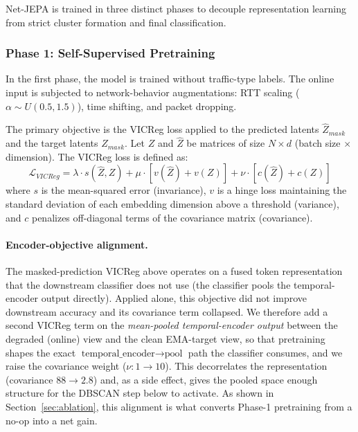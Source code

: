 \documentclass{article}
\begin{document}
Net-JEPA is trained in three distinct phases to decouple representation learning from strict cluster formation and final classification.

\subsubsection{Phase 1: Self-Supervised Pretraining}
In the first phase, the model is trained without traffic-type labels. The online input is subjected to network-behavior augmentations: RTT scaling ($\alpha \sim U(0.5, 1.5)$), time shifting, and packet dropping.

The primary objective is the VICReg loss \cite{bardes2021vicreg} applied to the predicted latents $\hat{Z}_{mask}$ and the target latents $Z_{mask}$. Let $Z$ and $\hat{Z}$ be matrices of size $N \times d$ (batch size $\times$ dimension). The VICReg loss is defined as:
\begin{equation}
    \mathcal{L}_{VICReg} = \lambda \cdot s(\hat{Z}, Z) + \mu \cdot \left[ v(\hat{Z}) + v(Z) \right] + \nu \cdot \left[ c(\hat{Z}) + c(Z) \right]
\end{equation}
where $s$ is the mean-squared error (invariance), $v$ is a hinge loss maintaining the standard deviation of each embedding dimension above a threshold (variance), and $c$ penalizes off-diagonal terms of the covariance matrix (covariance).

\paragraph{Encoder-objective alignment.} The masked-prediction VICReg above operates on a fused token representation that the downstream classifier does not use (the classifier pools the temporal-encoder output directly). Applied alone, this objective did not improve downstream accuracy and its covariance term collapsed. We therefore add a second VICReg term on the \emph{mean-pooled temporal-encoder output} between the degraded (online) view and the clean EMA-target view, so that pretraining shapes the exact $\text{temporal\_encoder} \rightarrow \text{pool}$ path the classifier consumes, and we raise the covariance weight ($\nu:1\rightarrow10$). This decorrelates the representation (covariance $88 \rightarrow 2.8$) and, as a side effect, gives the pooled space enough structure for the DBSCAN step below to activate. As shown in Section~\ref{sec:ablation}, this alignment is what converts Phase-1 pretraining from a no-op into a net gain.
\end{document}
